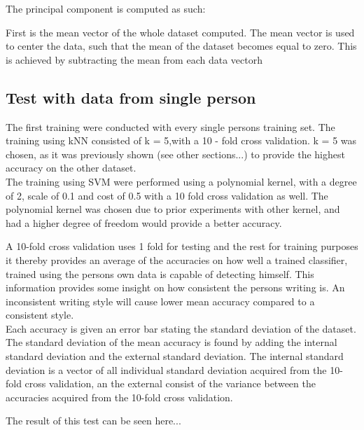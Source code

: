The principal component is computed as such: 

First is the mean vector of the whole dataset computed. 
The mean vector is used to center the data, such that the mean of the dataset 
becomes equal to zero. This is achieved by subtracting the mean from each data 
vectorh 

\subsection{Test with data from single person}
\label{sec::test_with_data_from_single_person}

The first training were conducted with every single persons training set. The 
training using kNN consisted of k = 5,with a 10 - fold cross validation. k = 5 
was chosen, as it was previously shown (see other sections...) to provide the highest accuracy on the other dataset. \\

The training using SVM were performed using a polynomial kernel, with a degree 
of 2, scale of 0.1   and cost of 0.5 with a 10 fold cross validation as well. 
The polynomial kernel was chosen due to prior experiments with other kernel, and 
had a higher degree of freedom would provide a better accuracy.\\ 

 
A
10-fold cross validation uses 1 fold for testing and the rest for training 
purposes it thereby provides an average of the accuracies on how well a trained 
classifier, trained using the persons own data is capable of detecting himself.  
This information provides some insight on how consistent the persons writing is. 
An inconsistent writing style will cause lower mean accuracy compared to a 
consistent style. \\

 Each accuracy is given an error bar stating the standard deviation of the 
dataset. The standard deviation of the mean accuracy is found by adding the 
internal standard deviation and the external standard deviation. The internal 
standard deviation is a vector of all individual standard deviation acquired 
from the 10-fold cross validation, an the external consist of the variance 
between the accuracies acquired  from the 10-fold cross validation. 
 
 The result of this test can be seen here...
 
